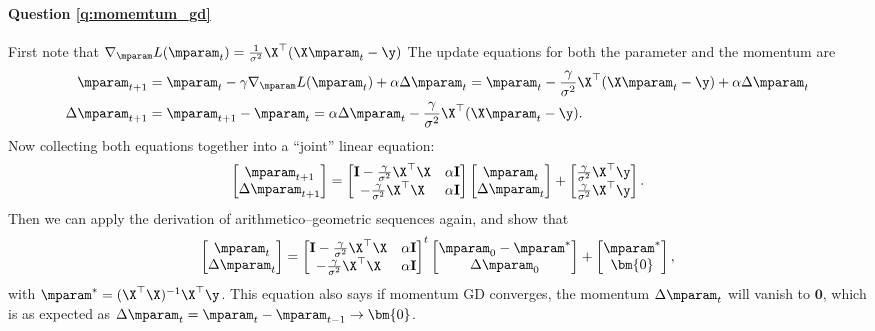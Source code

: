 \paragraph{Question \ref{q:momemtum_gd}}
First note that $\nabla_{\mparam}L(\mparam_t) = \frac{1}{\sigma^2} \X^\top (\X \mparam_t - \y)$
The update equations for both the parameter and the momentum are
\begin{equation}
\begin{aligned}
    \mparam_{t+1} &= \mparam_t - \gamma \nabla_{\mparam} L(\mparam_t) + \alpha \Delta \mparam_t = \mparam_t - \frac{\gamma}{\sigma^2} \X^\top (\X \mparam_t - \y) + \alpha \Delta \mparam_t \\
    \Delta \mparam_{t+1} &= \mparam_{t+1} - \mparam_t =  \alpha \Delta \mparam_t - \frac{\gamma}{\sigma^2} \X^\top (\X \mparam_t - \y).
\end{aligned}
\end{equation}
Now collecting both equations together into a ``joint'' linear equation:
\begin{equation}
\begin{bmatrix}
\mparam_{t+1} \\ \Delta \mparam_{t+1} 
\end{bmatrix} =
\begin{bmatrix}
\mathbf{I} - \frac{\gamma}{\sigma^2} \X^\top \X & \alpha \mathbf{I} \\ - \frac{\gamma}{\sigma^2} \X^\top \X & \alpha \mathbf{I} 
\end{bmatrix} 
\begin{bmatrix}
\mparam_t \\ \Delta \mparam_t 
\end{bmatrix} + 
\begin{bmatrix}
\frac{\gamma}{\sigma^2} \X^\top \y \\ \frac{\gamma}{\sigma^2} \X^\top \y 
\end{bmatrix}.
\end{equation}
Then we can apply the derivation of arithmetico–geometric sequences again, and show that
\begin{equation}
\begin{bmatrix}
\mparam_{t} \\ \Delta \mparam_{t} 
\end{bmatrix} =
\begin{bmatrix}
\mathbf{I} - \frac{\gamma}{\sigma^2} \X^\top \X & \alpha \mathbf{I} \\ - \frac{\gamma}{\sigma^2} \X^\top \X & \alpha \mathbf{I} 
\end{bmatrix}^t 
\begin{bmatrix}
\mparam_0 - \mparam^* \\ \Delta \mparam_0 
\end{bmatrix} + 
\begin{bmatrix}
\mparam^* \\ \bm{0} 
\end{bmatrix},
\end{equation}
with $\mparam^* = (\X^\top \X)^{-1} \X^\top \y$. This equation also says if momentum GD converges, the momentum $\Delta \mparam_t$ will vanish to $\bm{0}$, which is as expected as $\Delta \mparam_{t} = \mparam_{t} - \mparam_{t-1} \rightarrow \bm{0}$.